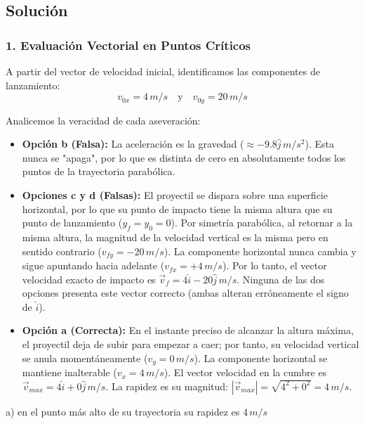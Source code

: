 \documentclass[12pt, a4paper]{article}
\begin{document}
\subsection*{Solución}

\subsubsection*{1. Evaluación Vectorial en Puntos Críticos}
A partir del vector de velocidad inicial, identificamos las componentes de lanzamiento:
$$ v_{0x} = 4\,\si{m/s} \quad \text{y} \quad v_{0y} = 20\,\si{m/s} $$

Analicemos la veracidad de cada aseveración:
\begin{itemize}
    \item \textbf{Opción b (Falsa):} La aceleración es la gravedad ($\approx -9.8\hat{j}\,\si{m/s^2}$). Esta nunca se "apaga", por lo que es distinta de cero en absolutamente todos los puntos de la trayectoria parabólica.
    \item \textbf{Opciones c y d (Falsas):} El proyectil se dispara sobre una superficie horizontal, por lo que su punto de impacto tiene la misma altura que su punto de lanzamiento ($y_f = y_0 = 0$). Por simetría parabólica, al retornar a la misma altura, la magnitud de la velocidad vertical es la misma pero en sentido contrario ($v_{fy} = -20\,\si{m/s}$). La componente horizontal nunca cambia y sigue apuntando hacia adelante ($v_{fx} = +4\,\si{m/s}$). Por lo tanto, el vector velocidad exacto de impacto es $\vec{v}_f = 4\hat{i} - 20\hat{j}\,\si{m/s}$. Ninguna de las dos opciones presenta este vector correcto (ambas alteran erróneamente el signo de $\hat{i}$).
    \item \textbf{Opción a (Correcta):} En el instante preciso de alcanzar la altura máxima, el proyectil deja de subir para empezar a caer; por tanto, su velocidad vertical se anula momentáneamente ($v_y = 0\,\si{m/s}$). La componente horizontal se mantiene inalterable ($v_x = 4\,\si{m/s}$).
    El vector velocidad en la cumbre es $\vec{v}_{max} = 4\hat{i} + 0\hat{j}\,\si{m/s}$. 
    La rapidez es su magnitud: $|\vec{v}_{max}| = \sqrt{4^2 + 0^2} = 4\,\si{m/s}$.
\end{itemize}

\begin{tcolorbox}[colback=green!5!white, colframe=green!50!black, title=Respuesta Final]
\centering \Large a) en el punto más alto de su trayectoria su rapidez es $4\,\si{m/s}$
\end{tcolorbox}
\end{document}
